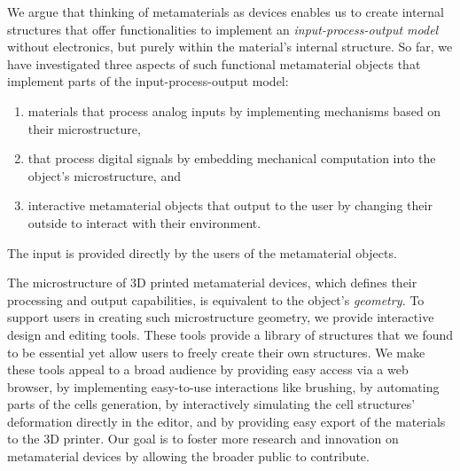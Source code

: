 We argue that thinking of metamaterials as devices enables us to create internal structures that offer functionalities to implement an \textit{input-process-output model} without electronics, but purely within the material’s internal structure. So far, we have investigated three aspects of such functional metamaterial objects that implement parts of the input-process-output model: 
\begin{enumerate}
    \item materials that process analog inputs by implementing mechanisms based on their microstructure,
    \item that process digital signals by embedding mechanical computation into the object’s microstructure, and
    \item interactive metamaterial objects that output to the user by changing their outside to interact with their environment.
\end{enumerate}
The input is provided directly by the users of the metamaterial objects.

The microstructure of 3D printed metamaterial devices, which defines their processing and output capabilities, is equivalent to the object’s \textit{geometry.} To support users in creating such microstructure geometry, we provide interactive design and editing tools. These tools provide a library of structures that we found to be essential yet allow users to freely create their own structures. We make these tools appeal to a broad audience by providing easy access via a web browser, by implementing easy-to-use interactions like brushing, by automating parts of the cells generation, by interactively simulating the cell structures’ deformation directly in the editor, and by providing easy export of the materials to the 3D printer. Our goal is to foster more research and innovation on metamaterial devices by allowing the broader public to contribute.









